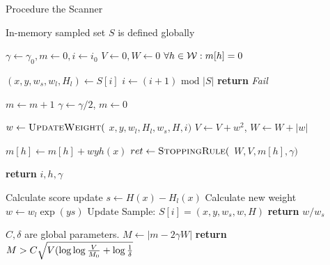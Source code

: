 \begin{algorithm}[H]

\caption{Procedure the Scanner}\label{alg-scanner}


\begin{algorithmic}[0]

\State In-memory sampled set $S$ is defined globally
\State



\State $\gamma \gets \gamma_0, m \gets 0, i \gets i_0$
\State $V \gets 0, W \gets 0$
\State $\forall h \in {\cal W}: m[h]=0$

\State $(x, y, w_s, w_l,H_l) \gets S[i]$  %
\State $ i \gets (i+1) \mbox{ mod } |S| $
   \State \textbf{return} \textit{Fail}
\EndIf

\State $m \gets m + 1$
   \State $\gamma \gets \gamma/2$, $m \gets 0$
\EndIf
   
\State $w \gets \textsc{UpdateWeight}($
\State \hspace{1.0cm} $x,y,w_l,H_l,w_s,H,i)$  %
\State $V \gets V+w^2$, $W \gets W + |w|$

\State $m[h] \gets m[h] + w y h(x)$
\State $ret \gets \textsc{StoppingRule}($
\State \hspace{1.5cm} $W,V,m[h],\gamma)$

\State \textbf{return} $i,h,\gamma$
\EndIf

\EndFor
\EndWhile

\EndFunction

\State



\State Calculate score update $s \gets H(x)-H_l(x)$
\State Calculate new weight $w \gets w_l \exp{(ys)}$ %
\State Update Sample: $S[i] = (x,y,w_s,w,H)$ %
\State \textbf{return} $w/w_s$
\EndFunction


\State


\State $C,\delta$ are global parameters.
\State $M \gets |m-2 \gamma W|$
\State \textbf{return} $M>C\sqrt{V(\log\log {V \over M_0}+ \log {1
    \over \delta}}$
\EndFunction



\end{algorithmic}

\end{algorithm}



